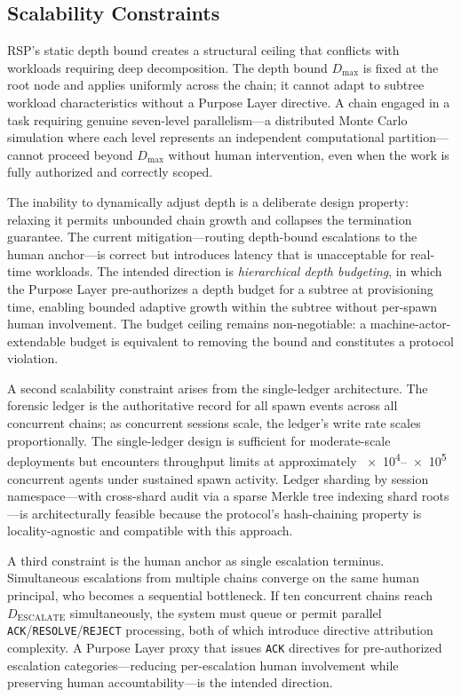 \subsection{Scalability Constraints}
\label{sec:rs-scalability}

RSP's static depth bound creates a structural ceiling that conflicts with workloads requiring deep decomposition. The depth bound $D_{\max}$ is fixed at the root node and applies uniformly across the chain; it cannot adapt to subtree workload characteristics without a Purpose Layer directive. A chain engaged in a task requiring genuine seven-level parallelism—a distributed Monte Carlo simulation where each level represents an independent computational partition—cannot proceed beyond $D_{\max}$ without human intervention, even when the work is fully authorized and correctly scoped.

The inability to dynamically adjust depth is a deliberate design property: relaxing it permits unbounded chain growth and collapses the termination guarantee. The current mitigation—routing depth-bound escalations to the human anchor—is correct but introduces latency that is unacceptable for real-time workloads. The intended direction is \emph{hierarchical depth budgeting}, in which the Purpose Layer pre-authorizes a depth budget for a subtree at provisioning time, enabling bounded adaptive growth within the subtree without per-spawn human involvement. The budget ceiling remains non-negotiable: a machine-actor-extendable budget is equivalent to removing the bound and constitutes a protocol violation.

A second scalability constraint arises from the single-ledger architecture. The forensic ledger is the authoritative record for all spawn events across all concurrent chains; as concurrent sessions scale, the ledger's write rate scales proportionally. The single-ledger design is sufficient for moderate-scale deployments but encounters throughput limits at approximately \numrange{e4}{e5} concurrent agents under sustained spawn activity. Ledger sharding by session namespace—with cross-shard audit via a sparse Merkle tree indexing shard roots—is architecturally feasible because the protocol's hash-chaining property is locality-agnostic and compatible with this approach.

A third constraint is the human anchor as single escalation terminus. Simultaneous escalations from multiple chains converge on the same human principal, who becomes a sequential bottleneck. If ten concurrent chains reach $D_{\text{ESCALATE}}$ simultaneously, the system must queue or permit parallel \texttt{ACK}/\texttt{RESOLVE}/\texttt{REJECT} processing, both of which introduce directive attribution complexity. A Purpose Layer proxy that issues \texttt{ACK} directives for pre-authorized escalation categories—reducing per-escalation human involvement while preserving human accountability—is the intended direction.

